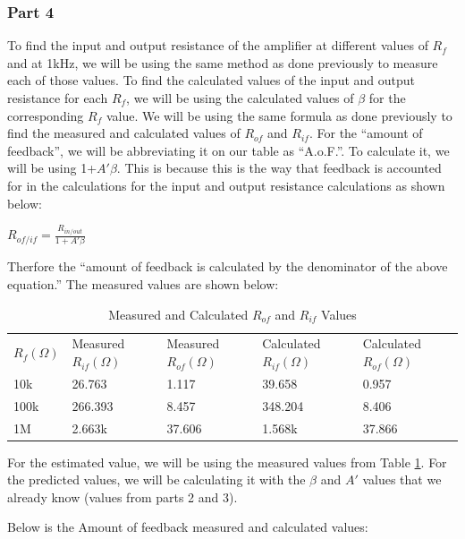 \documentclass[12pt]{article}
\begin{document}
\subsubsection{Part 4}
To find the input and output resistance of the amplifier at different values of $R_f$ and 
at 1kHz, we will be using the same method as done previously to measure each of those values.
To find the calculated values of the input and output resistance for each $R_f$, we 
will be using the calculated values of $\beta$ for the corresponding $R_f$ value. We 
will be using the same formula as done previously to find the measured and calculated
values of $R_{of}$ and $R_{if}$. For the ``amount of feedback'', we will be abbreviating it on our table as ``A.o.F.''. 
To calculate it, we will be using 1+$A'\beta$. This is because this is the way that feedback is accounted for in the 
calculations for the input and output resistance calculations as shown below:
\begin{center}
$R_{of/if}=\frac{R_{in/out}}{1+A'\beta}$
\end{center}
Therfore the ``amount of feedback is calculated by the denominator of the above equation.''
The measured values are shown below:

\begin{table}[h!]
    \centering
    \begin{tabular}{lllll}
    
    $R_f (\Omega)$ & Measured  $R_{if}(\Omega)$ & Measured $R_{of}(\Omega)$ & Calculated $R_{if}(\Omega)$ & Calculated  $R_{of}(\Omega)$ \\ \cline{1-5}
    10k & 26.763 & 1.117 & 39.658 & 0.957 \\ 
    100k & 266.393 & 8.457 & 348.204 & 8.406  \\
    1M & 2.663k & 37.606 & 1.568k & 37.866 
    \end{tabular}
    \caption{Measured and Calculated $R_{of}$ and $R_{if}$ Values}
    \label{tab:measuredcalcrifrof}
\end{table}

For the estimated value, we will be using the measured values from Table \ref{tab:measuredcalcrifrof}. For the predicted 
values, we will be calculating it with the $\beta$ and $A'$ values that we already know (values from parts 2 and 3).

Below is the Amount of feedback measured and calculated values:
\end{document}
